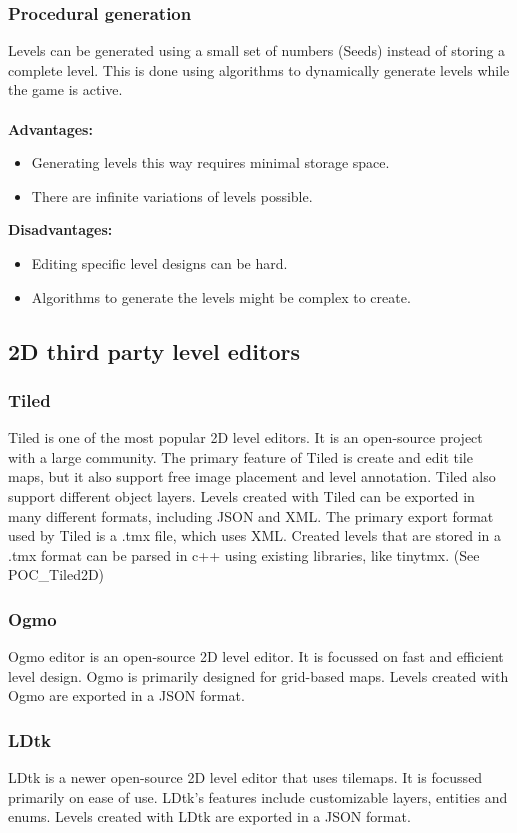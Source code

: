 \subsubsection{Procedural generation}
Levels can be generated using a small set of numbers (Seeds) instead of storing a complete level.
This is done using algorithms to dynamically generate levels while the game is active.
\\\\
\textbf{Advantages:}
\begin{itemize}
    \item Generating levels this way requires minimal storage space.
    \item There are infinite variations of levels possible.
\end{itemize}
\noindent\textbf{Disadvantages:}
\begin{itemize}
    \item Editing specific level designs can be hard.
    \item Algorithms to generate the levels might be complex to create.
\end{itemize}

\subsection{2D third party level editors}
\subsubsection {Tiled}
Tiled is one of the most popular 2D level editors.
It is an open-source project with a large community.
The primary feature of Tiled is create and edit tile maps, but it also support free image placement
and level annotation. Tiled also support different object layers.
Levels created with Tiled can be exported in many different formats, including JSON and XML. The primary export format used by Tiled is a .tmx file, which uses XML.
Created levels that are stored in a .tmx format can be parsed in c++ using existing libraries, like tinytmx. (See POC\_Tiled2D)

\subsubsection {Ogmo}
Ogmo editor is an open-source 2D level editor.
It is focussed on fast and efficient level design.
Ogmo is primarily designed for grid-based maps.
Levels created with Ogmo are exported in a JSON format.

\subsubsection {LDtk}
LDtk is a newer open-source 2D level editor that uses tilemaps.
It is focussed primarily on ease of use.
LDtk's features include customizable layers, entities and enums.
Levels created with LDtk are exported in a JSON format.
